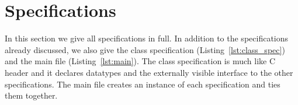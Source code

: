 \section{Specifications}

In this section we give all specifications in full. In addition to the specifications already discussed, we also give the class specification (Listing~\ref{lst:class_spec}) and the main file (Listing~\ref{lst:main}). The class specification is much like C header and it declares datatypes and the externally visible interface to the other specifications. The main file creates an instance of each specification and ties them together.

\vspace*{5mm}

\vspace*{5mm}

\vspace*{5mm}

\vspace*{5mm}

\vspace*{5mm}


